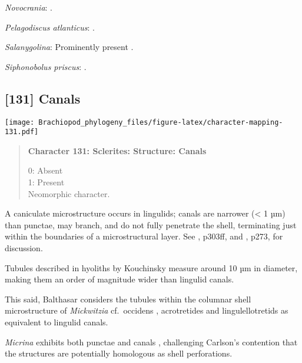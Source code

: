 \documentclass[openany]{book}
\theoremstyle{definition}
\theoremstyle{definition}
\theoremstyle{definition}
\theoremstyle{remark}
\begin{document}
\hypertarget{Novocrania-coding-130}{}
\emph{Novocrania}: \citet{Parkinson2005}.

\hypertarget{Pelagodiscus_atlanticus-coding-130}{}
\emph{Pelagodiscus atlanticus}: \citet{Williams1998Chemicostructural}.

\hypertarget{Salanygolina-coding-130}{}
\emph{Salanygolina}: Prominently present \citep{Holmer2009Theenigmatic}.

\hypertarget{Siphonobolus_priscus-coding-130}{}
\emph{Siphonobolus priscus}: \citep{Williams2004Chemicostructure}.

\subsection*{{[}131{]} Canals}\label{canals}

\texttt{[image: Brachiopod\_phylogeny\_files/figure-latex/character-mapping-131.pdf]}

\begin{quote}
\textbf{Character 131: Sclerites: Structure: Canals}

0: Absent\\
1: Present\\
Neomorphic character.
\end{quote}

A caniculate microstructure occurs in lingulids; canals are narrower
(\textless{} 1 µm) than punctae, may branch, and do not fully penetrate
the shell, terminating just within the boundaries of a microstructural
layer. See \citet{Williams1997Introduction}, p303ff, and
\citet{Balthasar2008iMummpikia}, p273, for discussion.

Tubules described in hyoliths by Kouchinsky
\citeyearpar{Kouchinsky2000Skeletalmicrostructures} measure around 10 µm
in diameter, making them an order of magnitude wider than lingulid
canals.

This said, Balthasar \citeyearpar{Balthasar2008iMummpikia} considers the
tubules within the columnar shell microstructure of \emph{Mickwitzia}
cf.~occidens \citep[1--3 µm wide,][]{Skovsted2003EarlyCambrian},
acrotretides \citep[1 µm wide,
see][\citet{Zhang2016Epithelialcell}]{Holmer1989MiddleOrdovician} and
lingulellotretids \citep[100 nm wide,][]{Cusack1999Chemicostructural} as
equivalent to lingulid canals.

\emph{Micrina} exhibits both punctae and canals
\citep{Harper2017Brachiopodsorigin}, challenging Carlson's contention
\citep[in][]{Williams2007Supplement} that the structures are potentially
homologous as shell perforations.
\end{document}
